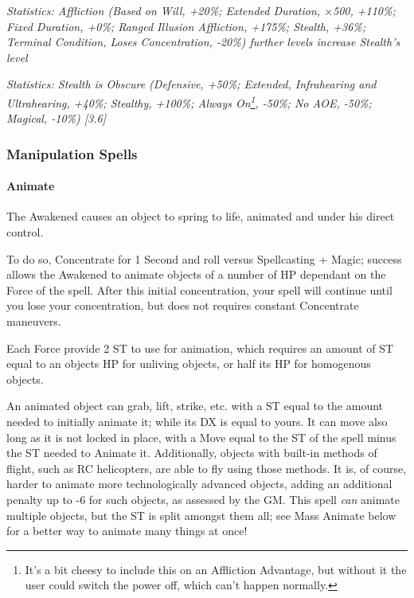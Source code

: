 \begin{multicols*}{3}
	\textcolor{OliveGreen}{\textit{Statistics: Affliction (Based on Will, +20\%; Extended Duration, $\times$500, +110\%; Fixed Duration, +0\%; Ranged Illusion Affliction, +175\%; Stealth, +36\%; Terminal Condition, Loses Concentration, -20\%) further levels increase Stealth's level}}
	
	\textcolor{OliveGreen}{\textit{Statistics: Stealth is Obscure (Defensive, +50\%; Extended, Infrahearing and Ultrahearing, +40\%; Stealthy, +100\%; Always On\footnote{It's a bit cheesy to include this on an Affliction Advantage, but without it the user could switch the power off, which can't happen normally.}, -50\%; No AOE, -50\%; Magical, -10\%) [3.6] }}
	
	\subsubsection{Manipulation Spells}
	
	\paragraph{Animate}
	
	The Awakened causes an object to spring to life, animated and under his direct control.
	
	To do so, Concentrate for 1 Second and roll versus Spellcasting + Magic; success allows the Awakened to animate objects of a number of HP dependant on the Force of the spell. After this initial concentration, your spell will continue until you lose your concentration, but does not requires constant Concentrate maneuvers.
	
	Each Force provide 2 ST to use for animation, which requires an amount of ST equal to an objects HP for unliving objects, or half its HP for homogenous objects.
	
	An animated object can grab, lift, strike, etc. with a ST equal to the amount needed to initially animate it; while its DX is equal to yours. It can move also long as it is not locked in place, with a Move equal to the ST of the spell minus the ST needed to Animate it. Additionally, objects with built-in methods of flight, such as RC helicopters, are able to fly using those methods. It is, of course, harder to animate more technologically advanced objects, adding an additional penalty up to -6 for such objects, as assessed by the GM. This spell \textit{can} animate multiple objects, but the ST is split amongst them all; see Mass Animate below for a better way to animate many things at once!
	

\end{multicols*}
